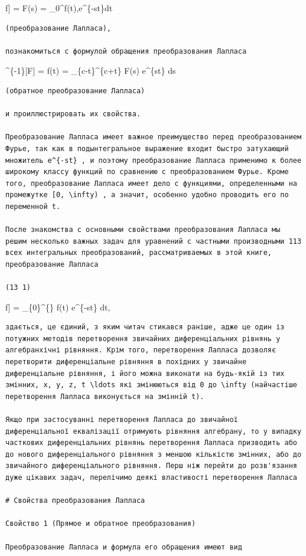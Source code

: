 \documentclass[
  ukrainian,
]{article}
\begin{document}
\mathscr{L}{[}f{]} = F(s) = \int\limits\_0\^{}\infty f(t),e\^{}\{-st\}dt

\begin{verbatim}
(преобразование Лапласа),

познакомиться с формулой обращения преобразования Лапласа
\end{verbatim}

\^{}\{-1\}{[}F{]} = f(t) = 
\int\_\{c-t\infty\}\^{}\{c+t\infty\} F(s) e\^{}\{st\} ds

\begin{verbatim}
(обратное преобразование Лапласа)

и проиллюстрировать их свойства.

Преобразование Лапласа имеет важное преимущество перед преобразованием Фурье, так как в подынтегральное выражение входит быстро затухающий множитель e^{-st} , и поэтому преобразование Лапласа применимо к более широкому классу функций по сравнению с преобразованием Фурье. Кроме того, преобразование Лапласа имеет дело с функциями, определенными на промежутке [0, \infty) , а значит, особенно удобно проводить его по переменной t.

После знакомства с основными свойствами преобразования Лапласа мы решим несколько важных задач для уравнений с частными производными 113 всех интегральных преобразований, рассматриваемых в этой книге, преобразование Лапласа

(13 1)
\end{verbatim}

\mathscr{Z}{[}f{]} = \int\_\{0\}\^{}\{\infty\} f(t) e\^{}\{-st\} dt,

\begin{verbatim}
здається, це єдиний, з яким читач стикався раніше, адже це один із потужних методів перетворення звичайних диференціальних рівнянь у алгебранхічні рівняння. Крім того, перетворення Лапласа дозволяє перетворити диференціальне рівняння в похідних у звичайне диференціальне рівняння, і його можна виконати на будь-якій із тих змінних, x, y, z, t \ldots які змінюються від 0 до \infty (найчастіше перетворення Лапласа виконується на змінній t).

Якщо при застосуванні перетворення Лапласа до звичайної диференціальної еквалізації отримують рівняння алгебрану, то у випадку часткових диференціальних рівнянь перетворення Лапласа призводить або до нового диференціального рівняння з меншою кількістю змінних, або до звичайного диференціального рівняння. Перш ніж перейти до розв'язання дуже цікавих задач, перелічимо деякі властивості перетворення Лапласа

# Свойства преобразования Лапласа

Свойство 1 (Прямое и обратное преобразования)

Преобразование Лапласа и формула его обращения имеют вид
\end{verbatim}
\end{document}
